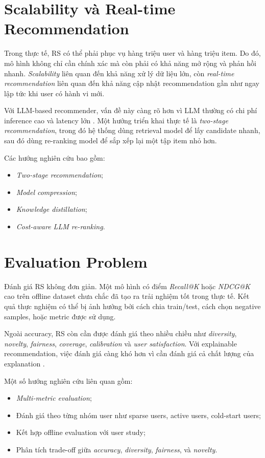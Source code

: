 \documentclass[12pt,a4paper]{article}
\begin{document}
\section{Scalability và Real-time Recommendation}

Trong thực tế, RS có thể phải phục vụ hàng triệu user và hàng triệu item. 
Do đó, mô hình không chỉ cần chính xác mà còn phải có khả năng mở rộng và phản hồi nhanh. 
\textit{Scalability} liên quan đến khả năng xử lý dữ liệu lớn, còn \textit{real-time recommendation} liên quan đến khả năng cập nhật recommendation gần như ngay lập tức khi user có hành vi mới.

Với LLM-based recommender, vấn đề này càng rõ hơn vì LLM thường có chi phí inference cao và latency lớn \cite{wu2024llmrec,fan2024llmrec}. 
Một hướng triển khai thực tế là \textit{two-stage recommendation}, trong đó hệ thống dùng retrieval model để lấy candidate nhanh, sau đó dùng re-ranking model để sắp xếp lại một tập item nhỏ hơn.

Các hướng nghiên cứu bao gồm:

\begin{itemize}[leftmargin=*]
    \item \textit{Two-stage recommendation};
    \item \textit{Model compression};
    \item \textit{Knowledge distillation};
    \item \textit{Cost-aware LLM re-ranking}.
\end{itemize}

\section{Evaluation Problem}

Đánh giá RS không đơn giản. 
Một mô hình có điểm \textit{Recall@K} hoặc \textit{NDCG@K} cao trên offline dataset chưa chắc đã tạo ra trải nghiệm tốt trong thực tế. 
Kết quả thực nghiệm có thể bị ảnh hưởng bởi cách chia train/test, cách chọn negative samples, hoặc metric được sử dụng.

Ngoài accuracy, RS còn cần được đánh giá theo nhiều chiều như \textit{diversity}, \textit{novelty}, \textit{fairness}, \textit{coverage}, \textit{calibration} và \textit{user satisfaction}. 
Với explainable recommendation, việc đánh giá càng khó hơn vì cần đánh giá cả chất lượng của explanation \cite{chen2022why}.

Một số hướng nghiên cứu liên quan gồm:

\begin{itemize}[leftmargin=*]
    \item \textit{Multi-metric evaluation};
    \item Đánh giá theo từng nhóm user như sparse users, active users, cold-start users;
    \item Kết hợp offline evaluation với user study;
    \item Phân tích trade-off giữa \textit{accuracy}, \textit{diversity}, \textit{fairness}, và \textit{novelty}.
\end{itemize}
\end{document}
